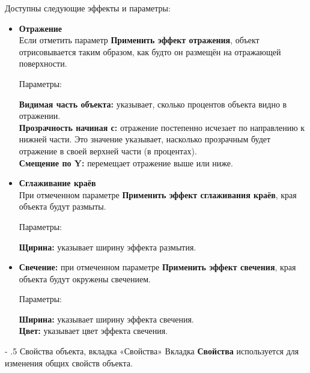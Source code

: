 \documentclass[a4paper,10pt]{article}
\makeatletter
\renewcommand\paragraph{%
   \@startsection{paragraph}{4}{0mm}%
      {-\baselineskip}%
      {.5\baselineskip}%
      {\normalfont\normalsize\bfseries}}
\makeatother
\begin{document}
 Доступны следующие эффекты и параметры:
 
 \begin{itemize}
  \item  \textbf{Отражение}\\
  Если отметить параметр \textbf{Применить эффект отражения}, объект отрисовывается таким образом, как будто он размещён на отражающей поверхности.
  
  Параметры:
  
  \textbf{Видимая часть объекта:} указывает, сколько процентов объекта видно в отражении.\\
  \textbf{Прозрачность начиная с:} отражение постепенно исчезает по направлению к нижней части. Это значение указывает, насколько прозрачным будет отражение в своей верхней части (в процентах).\\
\textbf{Смещение по Y:} перемещает отражение выше или ниже.
\item \textbf{Сглаживание краёв}\\
При отмеченном параметре \textbf{Применить эффект сглаживания краёв}, края объекта будут размыты.

Параметры:

\textbf{Щирина:} указывает ширину эффекта размытия.
\item \textbf{Свечение:} при отмеченном параметре \textbf{Применить эффект свечения}, края объекта будут окружены свечением.

Параметры: 

\textbf{Ширина:} указывает ширину эффекта свечения.\\
\textbf{Цвет:} указывает цвет эффекта свечения.
 \end{itemize}

\paragraph{Свойства объекта, вкладка «Свойства»}
Вкладка \textbf{Свойства} используется для изменения общих свойств объекта.
\end{document}
